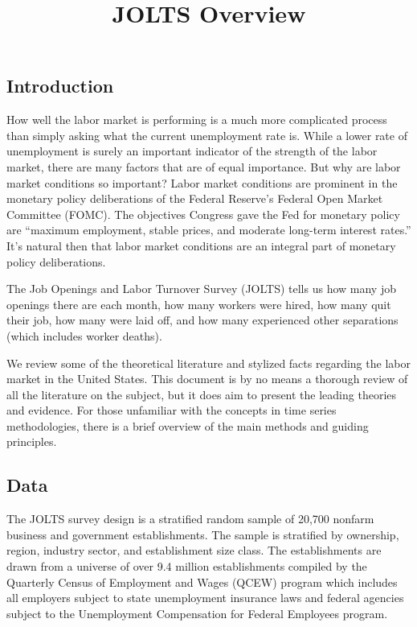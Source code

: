\documentclass[
  11pt,
]{article}
\title{JOLTS Overview}
\author{}
\date{\vspace{-2.5em}}
\begin{document}
\maketitle

\hypertarget{introduction}{%
\subsection{Introduction}\label{introduction}}

How well the labor market is performing is a much more complicated
process than simply asking what the current unemployment rate is. While
a lower rate of unemployment is surely an important indicator of the
strength of the labor market, there are many factors that are of equal
importance. But why are labor market conditions so important? Labor
market conditions are prominent in the monetary policy deliberations of
the Federal Reserve's Federal Open Market Committee (FOMC). The
objectives Congress gave the Fed for monetary policy are ``maximum
employment, stable prices, and moderate long-term interest rates.'' It's
natural then that labor market conditions are an integral part of
monetary policy deliberations.

The Job Openings and Labor Turnover Survey (JOLTS) tells us how many job
openings there are each month, how many workers were hired, how many
quit their job, how many were laid off, and how many experienced other
separations (which includes worker deaths).

We review some of the theoretical literature and stylized facts
regarding the labor market in the United States. This document is by no
means a thorough review of all the literature on the subject, but it
does aim to present the leading theories and evidence. For those
unfamiliar with the concepts in time series methodologies, there is a
brief overview of the main methods and guiding principles.

\hypertarget{data}{%
\subsection{Data}\label{data}}

The JOLTS survey design is a stratified random sample of 20,700 nonfarm
business and government establishments. The sample is stratified by
ownership, region, industry sector, and establishment size class. The
establishments are drawn from a universe of over 9.4 million
establishments compiled by the Quarterly Census of Employment and Wages
(QCEW) program which includes all employers subject to state
unemployment insurance laws and federal agencies subject to the
Unemployment Compensation for Federal Employees program.
\end{document}
